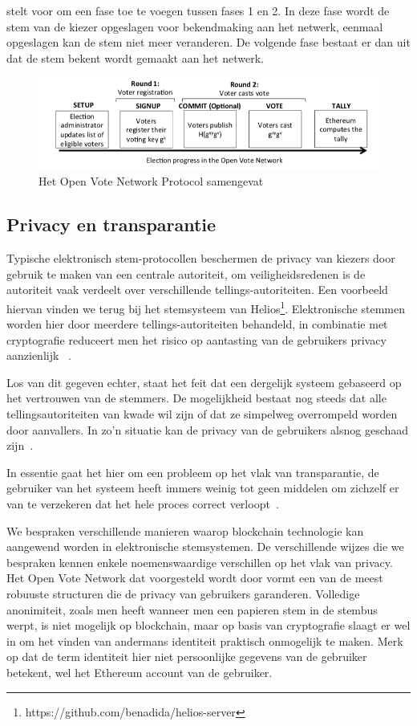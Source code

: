 			\textcite{McCorry2017} stelt voor om een fase toe te voegen tussen fases 1 en 2. In deze fase wordt de stem van de kiezer opgeslagen voor bekendmaking aan het netwerk, eenmaal opgeslagen kan de stem niet meer veranderen. De volgende fase bestaat er dan uit dat de stem bekent wordt gemaakt aan het netwerk. 

			\begin{figure}
				\includegraphics[width=\linewidth]{img/ovnp.png}
				\caption{Het Open Vote Network Protocol samengevat}
				\label{fig:ovnp}
			\end{figure} 
	
	\newpage
	\subsection{Privacy en transparantie}
		Typische elektronisch stem-protocollen beschermen de privacy van kiezers door gebruik te maken van een centrale autoriteit, om veiligheidsredenen is de autoriteit vaak verdeelt over verschillende tellings-autoriteiten. Een voorbeeld hiervan vinden we terug bij het stemsysteem van Helios\footnote{https://github.com/benadida/helios-server}. Elektronische stemmen worden hier door meerdere tellings-autoriteiten behandeld, in combinatie met cryptografie reduceert men het risico op aantasting van de gebruikers privacy aanzienlijk ~\autocite{Adida2008}. 
	
		Los van dit gegeven echter, staat het feit dat een dergelijk systeem gebaseerd op het vertrouwen van de stemmers. De mogelijkheid bestaat nog steeds dat alle tellingsautoriteiten van kwade wil zijn of dat ze simpelweg overrompeld worden door aanvallers. In zo’n situatie kan de privacy van de gebruikers alsnog geschaad zijn~\autocite{McCorry2017}.
		
		In essentie gaat het hier om een probleem op het vlak van transparantie, de gebruiker van het systeem heeft immers weinig tot geen middelen om zichzelf er van te verzekeren dat het hele proces correct verloopt~\autocite{McCorry2017}. 
		
		We bespraken verschillende manieren waarop blockchain technologie kan aangewend worden in elektronische stemsystemen. De verschillende wijzes die we bespraken kennen enkele noemenswaardige verschillen op het vlak van privacy. Het Open Vote Network dat voorgesteld wordt door \textcite{McCorry2017} vormt een van de meest robuuste structuren die de privacy van gebruikers garanderen. Volledige anonimiteit, zoals men heeft wanneer men een papieren stem in de stembus werpt, is niet mogelijk op blockchain, maar op basis van cryptografie slaagt \textcite{McCorry2017} er wel in om het vinden van andermans identiteit praktisch onmogelijk te maken. Merk op dat  de term identiteit hier niet persoonlijke gegevens van de gebruiker betekent, wel het Ethereum account van de gebruiker.
		
